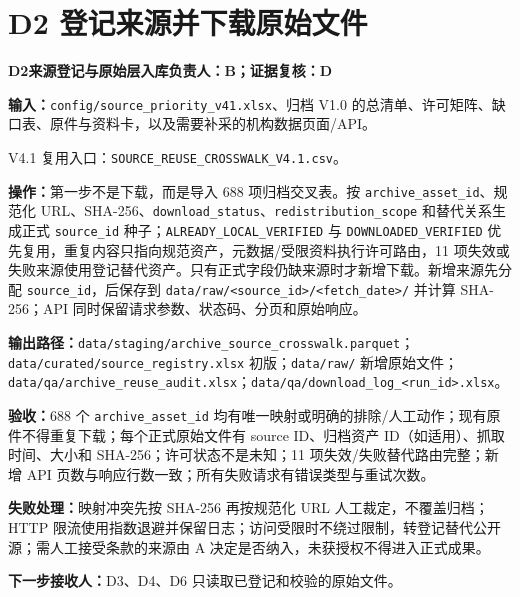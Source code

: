 \documentclass[UTF8,fontset=windows,12pt,openany]{ctexbook}
\newcommand{\Field}[1]{{\small\nolinkurl{#1}}}
\newcommand{\File}[1]{{\small\begingroup\urlstyle{same}\nolinkurl{#1}\endgroup}}
\newcommand{\StepTitle}[3]{%
  \noindent\colorbox{DeepNavy}{\parbox{0.965\textwidth}{\color{white}\Large\bfseries #1\quad #2\hfill\normalsize #3}}\par\medskip
}
\newcommand{\CardRow}[2]{\noindent\textbf{#1：}#2\par}
\begin{document}
\section{D2 登记来源并下载原始文件}
\StepTitle{D2}{来源登记与原始层入库}{负责人：B；证据复核：D}
\CardRow{输入}{\File{config/source_priority_v41.xlsx}、归档 V1.0 的总清单、许可矩阵、缺口表、原件与资料卡，以及需要补采的机构数据页面/API。\par V4.1 复用入口：\File{SOURCE_REUSE_CROSSWALK_V4.1.csv}。}
\CardRow{操作}{第一步不是下载，而是导入 688 项归档交叉表。按 \Field{archive_asset_id}、规范化 URL、SHA-256、\Field{download_status}、\Field{redistribution_scope} 和替代关系生成正式 \Field{source_id} 种子；\Field{ALREADY_LOCAL_VERIFIED} 与 \Field{DOWNLOADED_VERIFIED} 优先复用，重复内容只指向规范资产，元数据/受限资料执行许可路由，11 项失效或失败来源使用登记替代资产。只有正式字段仍缺来源时才新增下载。新增来源先分配 \Field{source_id}，后保存到 \File{data/raw/<source_id>/<fetch_date>/} 并计算 SHA-256；API 同时保留请求参数、状态码、分页和原始响应。}
\CardRow{输出路径}{\File{data/staging/archive_source_crosswalk.parquet}；\File{data/curated/source_registry.xlsx} 初版；\File{data/raw/} 新增原始文件；\File{data/qa/archive_reuse_audit.xlsx}；\File{data/qa/download_log_<run_id>.xlsx}。}
\CardRow{验收}{688 个 \Field{archive_asset_id} 均有唯一映射或明确的排除/人工动作；现有原件不得重复下载；每个正式原始文件有 source ID、归档资产 ID（如适用）、抓取时间、大小和 SHA-256；许可状态不是未知；11 项失效/失败替代路由完整；新增 API 页数与响应行数一致；所有失败请求有错误类型与重试次数。}
\CardRow{失败处理}{映射冲突先按 SHA-256 再按规范化 URL 人工裁定，不覆盖归档；HTTP 限流使用指数退避并保留日志；访问受限时不绕过限制，转登记替代公开源；需人工接受条款的来源由 A 决定是否纳入，未获授权不得进入正式成果。}
\CardRow{下一步接收人}{D3、D4、D6 只读取已登记和校验的原始文件。}
\end{document}
